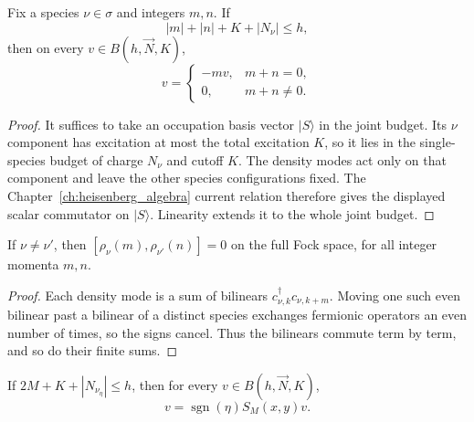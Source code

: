 \begin{lemma}
\label{lem:dual_signed_current_budget}
Fix a species $\nu\in\sigma$ and integers $m,n$. If
\begin{equation}
|m|+|n|+K+|N_\nu|\le h,
\end{equation}
then on every $v\in B(h,\vec N,K)$,
\begin{equation}
[\rho_\nu(m),\rho_\nu(n)]v=\begin{cases}-m v,&m+n=0,\\0,&m+n\ne0.\end{cases}
\end{equation}
\end{lemma}

\begin{proof}
It suffices to take an occupation basis vector $|S\rangle$ in the joint budget. Its $\nu$ component has excitation at most the total excitation $K$, so it lies in the single-species budget of charge $N_\nu$ and cutoff $K$. The density modes act only on that component and leave the other species configurations fixed. The Chapter~\ref{ch:heisenberg_algebra} current relation therefore gives the displayed scalar commutator on $|S\rangle$. Linearity extends it to the whole joint budget.
\end{proof}

\begin{lemma}
\label{lem:dual_cross_species_commute}
If $\nu\ne\nu'$, then $[\rho_\nu(m),\rho_{\nu'}(n)]=0$ on the full Fock space, for all integer momenta $m,n$.
\end{lemma}

\begin{proof}
Each density mode is a sum of bilinears $c^\dagger_{\nu,k}c_{\nu,k+m}$. Moving one such even bilinear past a bilinear of a distinct species exchanges fermionic operators an even number of times, so the signs cancel. Thus the bilinears commute term by term, and so do their finite sums.
\end{proof}

\begin{lemma}
\label{lem:dual_chiral_commutator}
If $2M+K+|N_{\nu_\eta}|\le h$, then for every $v\in B(h,\vec N,K)$,
\begin{equation}
[\varphi_\eta(x),\varphi_\eta(y)]v=\operatorname{sgn}(\eta)S_M(x,y)v.
\end{equation}
\end{lemma}

